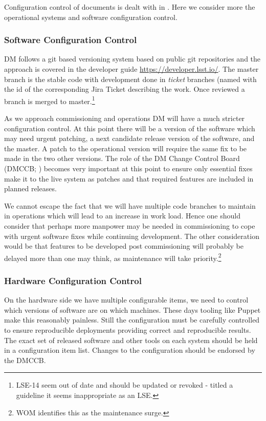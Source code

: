 Configuration control of documents is dealt with in . Here we consider more the operational systems and software configuration control.

\subsubsection{Software Configuration Control}

DM follows a git based versioning system based  on public git repositories and the approach is covered in the developer guide \url{https://developer.lsst.io/}.
The master branch is the stable code with development done in {\em ticket} branches (named with the id of the corresponding Jira Ticket describing the work.
Once reviewed a branch is merged to master.\footnote{LSE-14 seem out of date and should be updated or revoked - titled a guideline it seems inappropriate as an LSE.}

As we approach commissioning and operations DM will have a much stricter configuration control.
At this point there will be a version of the software which may need urgent patching, a next candidate release version of the software, and the master.
A patch to the operational version will require the same fix to be made in the two other versions.
The role of the DM Change Control Board (DMCCB; ) becomes very important at this point to ensure only essential fixes make it to the live system as patches and that required features are included in planned releases.

We cannot escape the fact that we  will have multiple code branches to maintain in operations which will lead to an increase in work load.
Hence one should consider that perhaps more manpower may be needed in commissioning to cope with urgent software fixes while continuing development.
The other consideration would be that features to be developed post commissioning will probably be delayed more than one may think, as maintenance will take priority.\footnote{WOM identifies this as the maintenance surge.}

\subsubsection{Hardware Configuration Control}

On the hardware side we have multiple configurable items, we need to control which versions of software are on which machines. These days tooling like Puppet make this reasonably painless. Still the configuration  must be carefully controlled to ensure reproducible deployments providing correct and reproducible results. The exact set of released software and other tools on each system should be held in a configuration item list.
Changes to the configuration should be endorsed by the DMCCB.

